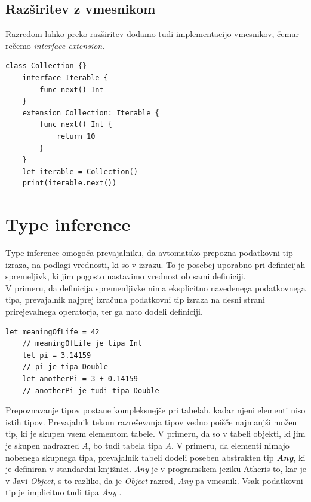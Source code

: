 \documentclass[a4paper, 12p]{book}
\begin{document}
\subsection{Razširitev z vmesnikom}

Razredom lahko preko razširitev dodamo tudi implementacijo vmesnikov, čemur rečemo \textit{interface extension}.

\begin{lstlisting}[caption=Razširitev z vmesnikom., captionpos=b]
	class Collection {}
	interface Iterable {
	    func next() Int
	}
	extension Collection: Iterable {
	    func next() Int {
	        return 10
	    }
	}
	let iterable = Collection()
	print(iterable.next())
\end{lstlisting}

\section{Type inference}

Type inference omogoča prevajalniku, da avtomatsko prepozna podatkovni tip izraza, na podlagi vrednosti, ki so v izrazu. To je posebej uporabno pri definicijah spremeljivk, ki jim pogosto nastavimo vrednost ob sami definiciji. \\
\indent V primeru, da definicija spremenljivke nima eksplicitno navedenega podatkovnega tipa, prevajalnik najprej izračuna podatkovni tip izraza na desni strani prirejevalnega operatorja, ter ga nato dodeli definiciji.

\begin{lstlisting}[caption={Avtomatično prepoznavanje podatkovnih tipov.}, captionpos=b]
	let meaningOfLife = 42
	// meaningOfLife je tipa Int
	let pi = 3.14159
	// pi je tipa Double
	let anotherPi = 3 + 0.14159
	// anotherPi je tudi tipa Double
\end{lstlisting}

Prepoznavanje tipov postane kompleksnejše pri tabelah, kadar njeni elementi niso istih tipov. Prevajalnik tekom razreševanja tipov vedno poišče najmanjši možen tip, ki je skupen vsem elementom tabele. V primeru, da so v tabeli objekti, ki jim je skupen nadrazred \textit{A}, bo tudi tabela tipa \textit{A}. V primeru, da elementi nimajo nobenega skupnega tipa, prevajalnik tabeli dodeli poseben abstrakten tip \textit{\textbf{Any}}, ki je definiran v standardni knjižnici. \textit{Any} je v programskem jeziku Atheris to, kar je v Javi \textit{Object}, s to razliko, da je \textit{Object} razred, \textit{Any} pa vmesnik. Vsak podatkovni tip je implicitno tudi tipa \textit{Any} .
\end{document}
